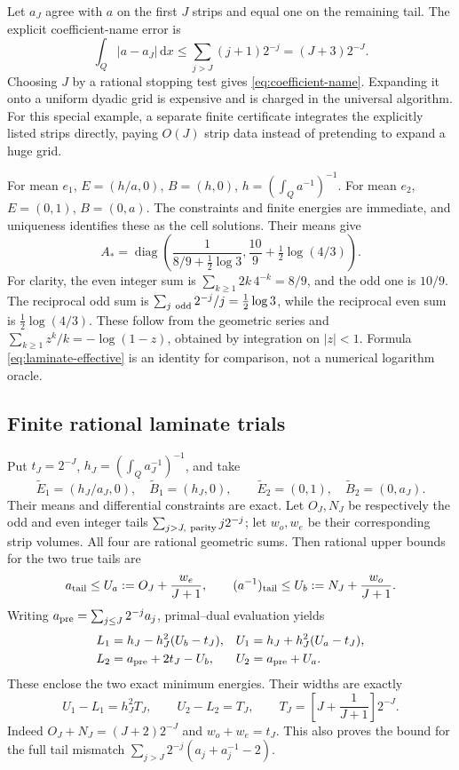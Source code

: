 \documentclass[11pt,a4paper]{article}
\numberwithin{equation}{section}
\theoremstyle{definition}
\theoremstyle{remark}\newtheorem{remark}[theorem]{Remark}
\DeclareMathOperator{\diag}{diag}
\newcommand{\dd}{\,\mathrm dx}
\begin{document}
Let \(a_J\) agree with \(a\) on the first \(J\) strips and equal one
on the remaining tail. The explicit coefficient-name error is
\[
 \int_Q|a-a_J|\dd\leq\sum_{j>J}(j+1)2^{-j}=(J+3)2^{-J}.
\]
Choosing \(J\) by a rational stopping test gives
\eqref{eq:coefficient-name}. Expanding it onto a uniform dyadic
grid is expensive and is charged in the universal algorithm.
For this special example, a separate finite certificate integrates
the explicitly listed strips directly, paying \(O(J)\) strip data
instead of pretending to expand a huge grid.

For mean \(e_1\), \(E=(h/a,0)\), \(B=(h,0)\),
\(h=(\int_Qa^{-1})^{-1}\).
For mean \(e_2\), \(E=(0,1)\), \(B=(0,a)\).
The constraints and finite energies are immediate, and uniqueness
identifies these as the cell solutions. Their means give
\begin{equation}\label{eq:laminate-effective}
 A_*=\diag\left(
  \frac1{8/9+\tfrac12\log3},
  \frac{10}{9}+\tfrac12\log(4/3)\right).
\end{equation}
For clarity, the even integer sum is
\(\sum_{k\geq1}2k\,4^{-k}=8/9\), and the odd one is \(10/9\).
The reciprocal odd sum is
\(\sum_{j\ {\rm odd}}2^{-j}/j=\tfrac12\log3\), while the
reciprocal even sum is \(\tfrac12\log(4/3)\).
These follow from the geometric series and
\(\sum_{k\geq1}z^k/k=-\log(1-z)\), obtained by integration on
\(|z|<1\). Formula \eqref{eq:laminate-effective} is an identity for
comparison, not a numerical logarithm oracle.

\subsection{Finite rational laminate trials}

Put \(t_J=2^{-J}\), \(h_J=(\int_Qa_J^{-1})^{-1}\), and take
\[
 \widetilde E_1=(h_J/a_J,0),\quad\widetilde B_1=(h_J,0),\qquad
 \widetilde E_2=(0,1),\quad\widetilde B_2=(0,a_J).
\]
Their means and differential constraints are exact.
Let \(O_J,N_J\) be respectively the odd and even integer tails
\(\sum_{j>J,\ {\rm parity}}j2^{-j}\); let \(w_o,w_e\) be their
corresponding strip volumes. All four are rational geometric sums.
Then rational upper bounds for the two true tails are
\[
 a_{\rm tail}\leq U_a:=O_J+\frac{w_e}{J+1},\qquad
 (a^{-1})_{\rm tail}\leq U_b:=N_J+\frac{w_o}{J+1}.
\]
Writing \(a_{\rm pre}=\sum_{j\leq J}2^{-j}a_j\), primal--dual
evaluation yields
\begin{align*}
 L_1&=h_J-h_J^2(U_b-t_J),&
 U_1&=h_J+h_J^2(U_a-t_J),\\
 L_2&=a_{\rm pre}+2t_J-U_b,&
 U_2&=a_{\rm pre}+U_a.
\end{align*}
These enclose the two exact minimum energies. Their widths are exactly
\begin{equation}\label{eq:laminate-gap}
 U_1-L_1=h_J^2T_J,\qquad U_2-L_2=T_J,\qquad
 T_J=\left[J+\frac1{J+1}\right]2^{-J}.
\end{equation}
Indeed \(O_J+N_J=(J+2)2^{-J}\) and \(w_o+w_e=t_J\).
This also proves the bound for the full tail mismatch
\(\sum_{j>J}2^{-j}(a_j+a_j^{-1}-2)\).
\end{document}
